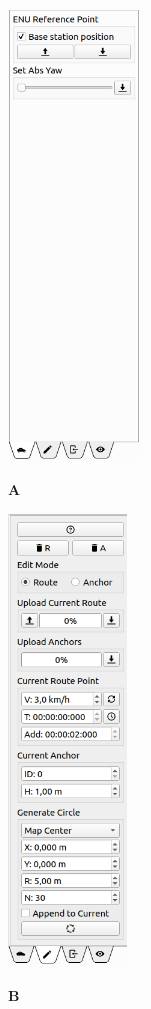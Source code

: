 \documentclass[12pt]{article} %
\begin{document}
\noindent\begin{minipage}{0.25\textwidth}
\noindent \includegraphics[width=\textwidth,height=12cm]{./screens/map_car_control_panel2.png}
\begin{center}
{\bf A}
\end{center}
\end{minipage}
\noindent\begin{minipage}{0.25\textwidth}  
\noindent\includegraphics[width=\textwidth,height=12cm]{./screens/map_edit_panel.png}
\begin{center}
{\bf B}
\end{center}
\end{minipage}
\end{document}
